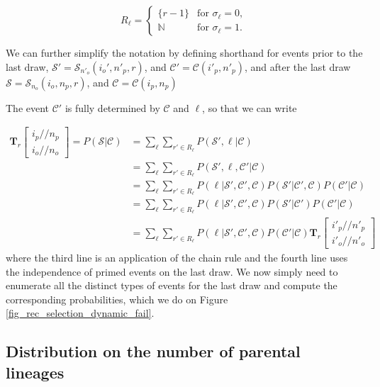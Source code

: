 \documentclass[review,nonatbib]{elsarticle}
\newcommand{\dslash}{/\!\!/}
\newcommand{\Coalc}[4]{\begin{bmatrix}#1\dslash #2 \\ #3\dslash #4 \end{bmatrix}}
\newcommand{\CC}{\mathcal{C}}
\newcommand{\ms}{\mathcal{S}}
\begin{document}
\begin{equation}
  R_\ell = \begin{cases}
    \{r-1\}    & \text{for } \sigma_\ell = 0, \\
    \mathbb{N} & \text{for } \sigma_\ell = 1.
  \end{cases}
\end{equation}

We can further simplify the notation by defining shorthand for events prior to the last draw,
 $\ms' = \ms_{n'_o}(i_o', n'_p, r)$, and $\CC' = \CC{(i'_p,n'_p)}$, and after the
last draw $\ms = \ms_{n_o}(i_o, n_p, r)$, and $\CC = \CC{(i_p,n_p)}$

The event  $\CC'$ is fully determined by  $\CC$ and $\ell$, so that we can write

\begin{equation}
  \begin{split}
    \mathbf{T}_{r}\Coalc{i_p}{n_p}{i_o}{n_o} = P(\ms| \CC) &= \sum_\ell \sum_{r' \in R_\ell}
    P(\ms',\ell | \CC) \\
    &=\sum_\ell \sum_{r' \in R_\ell}P( \ms',\ell, \CC' |\CC) \\
    &=\sum_\ell \sum_{r' \in R_\ell}P(\ell | \ms', \CC', \CC ) P( \ms'| \CC', \CC)  P(\CC' |\CC) \\
    &=\sum_\ell \sum_{r' \in R_\ell}P(\ell | \ms', \CC', \CC ) P( \ms'| \CC')       P(\CC' |\CC) \\
    &=\sum_\ell \sum_{r' \in R_\ell}P(\ell | \ms', \CC', \CC ) P(\CC' |\CC)  \mathbf{T}_{r}\Coalc{i'_p}{n'_p}{i'_o}{n'_o}
  \end{split}
\end{equation}
where the third line is an application of the chain rule and the fourth line uses the independence
of primed events on the last draw.  We now simply need to enumerate all the distinct types of
events for the last draw and compute the corresponding probabilities, which we do on Figure
\ref{fig_rec_selection_dynamic_fail}.

\subsection{Distribution on the number of parental lineages}


\end{document}
